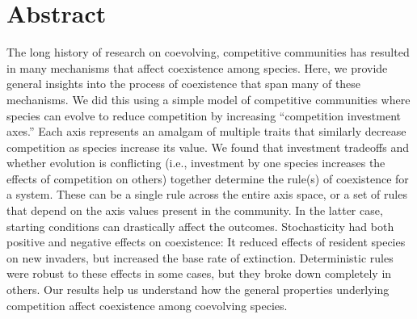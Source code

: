 \section*{Abstract}




The long history of research on coevolving, competitive communities has resulted in 
many mechanisms that affect coexistence among species.
Here, we provide general insights into the process of coexistence that span
many of these mechanisms.
We did this using a simple model of competitive communities where 
species can evolve to reduce competition by increasing
``competition investment axes.''
Each axis represents an amalgam of multiple traits that similarly decrease
competition as species increase its value.
We found that investment tradeoffs and whether evolution is conflicting
(i.e., investment by one species increases the effects of competition 
on others) together determine the rule(s) of coexistence for a system.
These can be a single rule across the entire axis space, or
a set of rules that depend on the axis values present in the community.
In the latter case, starting conditions can drastically affect the outcomes.
Stochasticity had both positive and negative effects on coexistence:
It reduced effects of resident species on new invaders, 
but increased the base rate of extinction.
Deterministic rules were robust to these effects in some cases, but
they broke down completely in others.
Our results help us understand how the general properties underlying
competition affect coexistence among coevolving species.




